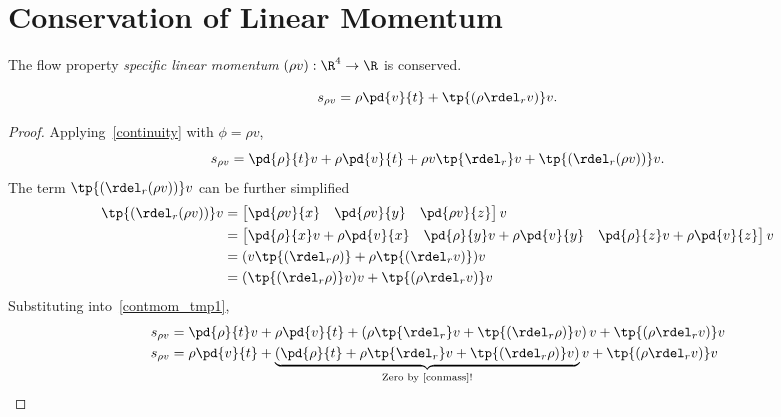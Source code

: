\section{Conservation of Linear Momentum}
\begin{df}
    The flow property \emph{specific linear momentum} $(\rho v):\R^4\to \R$ is conserved.
\end{df}
\begin{thm}
    \begin{equation}
        \label{convlinmom}
        s_{\rho v} = \rho \pd{v}{t} + \tp{( \rho \rdel_r v )} v.
    \end{equation}
\end{thm}
\begin{proof}
    Applying~\autoref{continuity} with $\phi=\rho v$,
    \begin{equation}
        \label{contmom_tmp1}
        s_{\rho v} = \pd{\rho}{t}v + \rho \pd{v}{t}  + \rho v \tp{\rdel_r} v  + \tp{(\rdel_r(\rho v))} v.
    \end{equation}
    The term $\tp{(\rdel_r (\rho v))}v$ can be further simplified
    \begin{align}
        \tp{(\rdel_r (\rho v))}v &= \begin{bmatrix}
            \pd{\rho v}{x} & \pd{\rho v}{y} & \pd{\rho v}{z}
        \end{bmatrix} v \\
        &= \begin{bmatrix}
            \pd{\rho}{x} v + \rho \pd{v}{x} & \pd{\rho}{y} v + \rho \pd{v}{y} & \pd{\rho}{z} v + \rho \pd{v}{z}
        \end{bmatrix} v \\
        &= (v\tp{(\rdel_r\rho)} + \rho \tp{(\rdel_r v)}) v \\
        &= (\tp{(\rdel_r\rho)}v)v + \tp{(\rho \rdel_r v)} v
    \end{align}
    Substituting into~\autoref{contmom_tmp1},
    \begin{align}
        s_{\rho v} &= \pd{\rho}{t}v + \rho \pd{v}{t}  + \left(\rho \tp{\rdel_r} v + \tp{(\rdel_r\rho)}v \right) v  + \tp{( \rho \rdel_r v )} v \\
        s_{\rho v} &= \rho \pd{v}{t}  + \underbrace{\left(\pd{\rho}{t} + \rho \tp{\rdel_r} v + \tp{(\rdel_r\rho)}v \right)}_{\text{Zero by~\autoref{conmass}!}} v  + \tp{( \rho \rdel_r v )} v
    \end{align}
\end{proof}
